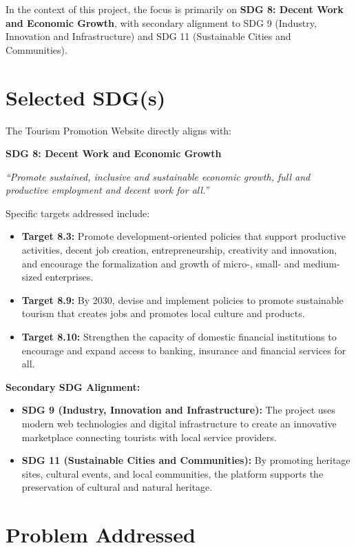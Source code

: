In the context of this project, the focus is primarily on \textbf{SDG 8: Decent Work and Economic Growth}, with secondary alignment to SDG 9 (Industry, Innovation and Infrastructure) and SDG 11 (Sustainable Cities and Communities).

\section{Selected SDG(s)}

The Tourism Promotion Website directly aligns with:

\textbf{SDG 8: Decent Work and Economic Growth}

\textit{``Promote sustained, inclusive and sustainable economic growth, full and productive employment and decent work for all.''}

Specific targets addressed include:

\begin{itemize}[leftmargin=2em]
    \item \textbf{Target 8.3:} Promote development-oriented policies that support productive activities, decent job creation, entrepreneurship, creativity and innovation, and encourage the formalization and growth of micro-, small- and medium-sized enterprises.
    \item \textbf{Target 8.9:} By 2030, devise and implement policies to promote sustainable tourism that creates jobs and promotes local culture and products.
    \item \textbf{Target 8.10:} Strengthen the capacity of domestic financial institutions to encourage and expand access to banking, insurance and financial services for all.
\end{itemize}

\textbf{Secondary SDG Alignment:}
\begin{itemize}[leftmargin=2em]
    \item \textbf{SDG 9 (Industry, Innovation and Infrastructure):} The project uses modern web technologies and digital infrastructure to create an innovative marketplace connecting tourists with local service providers.
    \item \textbf{SDG 11 (Sustainable Cities and Communities):} By promoting heritage sites, cultural events, and local communities, the platform supports the preservation of cultural and natural heritage.
\end{itemize}

\section{Problem Addressed}

